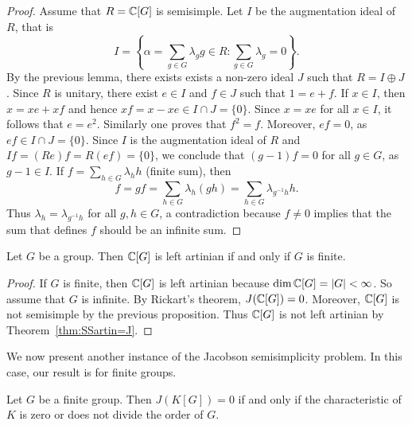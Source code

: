 \begin{proof}
	Assume that $R=\mathbb{C}[G]$ is semisimple.  Let $I$ 
	be the augmentation ideal of $R$, that is
	\[
	I=\left\{\alpha=\sum_{g\in G}\lambda_gg\in R:\sum_{g\in G}\lambda_g=0\right\}.
	\]
	By the previous lemma, 
	there exists exists a non-zero ideal $J$ such that 
	$R=I\oplus J$. Since $R$ is unitary, there exist $e\in I$ and $f\in J$ such that
	$1=e+f$. If
	$x\in I$, then $x=xe+xf$ and hence $xf=x-xe\in I\cap J=\{0\}$. Since 
	$x=xe$ for all $x\in I$, it follows that $e=e^2$. Similarly one proves
	that $f^2=f$. Moreover, $ef=0$, as $ef\in I\cap J=\{0\}$.  Since $I$ 
	is the augmentation ideal of $R$ and $If=(Re)f=R(ef)=\{0\}$, we conclude that
	$(g-1)f=0$
	for all $g\in G$, as $g-1\in I$. If $f=\sum_{h\in
	G}\lambda_hh$ (finite sum), then  
	\[
	f=gf=\sum_{h\in G}\lambda_h(gh)=\sum_{h\in
	G}\lambda_{g^{-1}h}h.
	\]
	Thus $\lambda_h=\lambda_{g^{-1}h}$ for all $g,h\in G$, a contradiction because 
	$f\ne 0$ implies that the sum that defines $f$ should be an infinite sum.
\end{proof}


\begin{theorem}
	Let $G$ be a group. Then $\mathbb{C}[G]$ 
	is left artinian if and only if 
	$G$ is finite. 
\end{theorem}

\begin{proof}
    If $G$ is finite, then $\mathbb{C}[G]$ is left artinian because $\dim\mathbb{C}[G]=|G|<\infty$. So assume that 
    $G$ is infinite. By Rickart's theorem,   
	$J(\mathbb{C}[G])=0$. Moreover, $\mathbb{C}[G]$
	is not semisimple by the previous proposition. Thus
	$\mathbb{C}[G]$ is not left artinian by Theorem~\ref{thm:SSartin=J}.
\end{proof}


We now present another instance of the Jacobson semisimplicity problem.
In this case, our result is for finite groups. 

\begin{theorem}[Maschke]
	Let $G$ be a finite group. Then $J(K[G])=0$ if and only 
	if the characteristic of $K$ is zero 
	or does not divide the order of $G$. 
\end{theorem}

